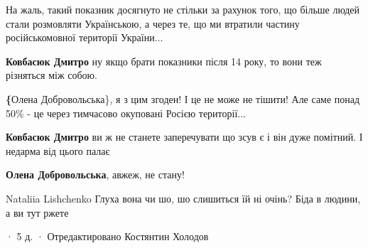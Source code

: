  

На жаль, такий показник досягнуто не стільки за рахунок того, що більше людей
стали розмовляти Українською, а через те, що ми втратили частину
російськомовної території України...

\begin{itemize}
 
\textbf{Ковбасюк Дмитро} ну якщо брати показники після 14 року, то вони теж різняться між собою.

 
\textbf\{Олена Добровольська\}, я з цим згоден! І це не може не тішити! Але саме понад 50\% - це через тимчасово окуповані Росією території...

 
\textbf{Ковбасюк Дмитро} ви ж не станете заперечувати що зсув є і він дуже помітний. І недарма від цього палає

 
\textbf{Олена Добровольська}, авжеж, не стану!
\end{itemize}

Nataliia Lishchenko
Глуха вона чи шо, шо слишиться їй ні очінь? Біда в людини, а ви тут ржете

 · 5 д. · Отредактировано
Костянтин Холодов

